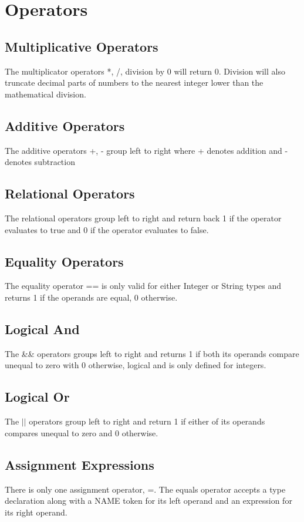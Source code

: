 \documentclass[12pt]{article}
\begin{document}
\section{Operators}

\subsection{Multiplicative Operators}
The multiplicator operators *, /, %
division by 0 will return 0.  Division will also truncate decimal parts of numbers to the nearest integer lower than the mathematical division.

\subsection{Additive Operators}
The additive operators +, - group left to right where + denotes addition and - denotes subtraction

\subsection{Relational Operators}
The relational operators group left to right and return back 1 if the operator evaluates to true and 0 if the operator evaluates to false. 
 
\subsection{Equality Operators}
The equality operator == is only valid for either Integer or String types and returns 1 if the operands are equal, 0 otherwise. 

\subsection{Logical And}
The \&\& operators groups left to right and returns 1 if both its operands
compare unequal to zero with 0 otherwise, logical and is only defined for integers.

\subsection{Logical Or}
The $\vert \vert$ operators group left to right and return 1 if either of its operands compares unequal to zero and 0 otherwise.

\subsection{Assignment Expressions}
There is only one assignment operator, =.  The equals operator accepts a type declaration along with a NAME token for its left operand and an expression for its right operand. 
 
\end{document}
